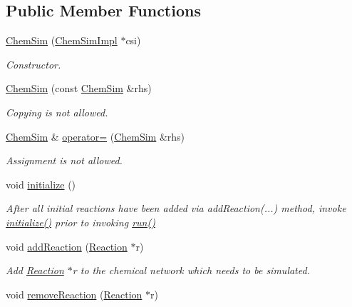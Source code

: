 \subsection*{Public Member Functions}
\begin{DoxyCompactItemize}
\item 
\hyperlink{classchem_1_1ChemSim_a650a80164d4545c984feae82929ea6d6}{Chem\-Sim} (\hyperlink{classchem_1_1ChemSimImpl}{Chem\-Sim\-Impl} $\ast$csi)
\begin{DoxyCompactList}\small\item\em Constructor. \end{DoxyCompactList}\item 
\hyperlink{classchem_1_1ChemSim_a3913850f42c21b7d047b4516bab90293}{Chem\-Sim} (const \hyperlink{classchem_1_1ChemSim}{Chem\-Sim} \&rhs)
\begin{DoxyCompactList}\small\item\em Copying is not allowed. \end{DoxyCompactList}\item 
\hyperlink{classchem_1_1ChemSim}{Chem\-Sim} \& \hyperlink{classchem_1_1ChemSim_a80f99f736b36adacb3888052f6ab933d}{operator=} (\hyperlink{classchem_1_1ChemSim}{Chem\-Sim} \&rhs)
\begin{DoxyCompactList}\small\item\em Assignment is not allowed. \end{DoxyCompactList}\item 
void \hyperlink{classchem_1_1ChemSim_a691cc53afccbda480a674b7f3014ac72}{initialize} ()
\begin{DoxyCompactList}\small\item\em After all initial reactions have been added via add\-Reaction(...) method, invoke \hyperlink{classchem_1_1ChemSim_a691cc53afccbda480a674b7f3014ac72}{initialize()} prior to invoking \hyperlink{classchem_1_1ChemSim_a1cc6ec051c2f0124bfa327816443b24b}{run()} \end{DoxyCompactList}\item 
void \hyperlink{classchem_1_1ChemSim_a9416fd66c400440bd13779a3060a1ec0}{add\-Reaction} (\hyperlink{classchem_1_1Reaction}{Reaction} $\ast$r)
\begin{DoxyCompactList}\small\item\em Add \hyperlink{classchem_1_1Reaction}{Reaction} $\ast$r to the chemical network which needs to be simulated. \end{DoxyCompactList}\item 
void \hyperlink{classchem_1_1ChemSim_a50f196d75b70e55e0257f20851f8aacf}{remove\-Reaction} (\hyperlink{classchem_1_1Reaction}{Reaction} $\ast$r)

\end{DoxyCompactItemize}
